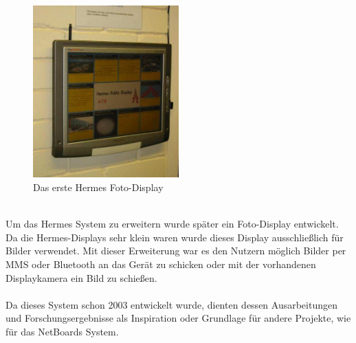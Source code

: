\begin{figure}[h!]
  \centering
  \includegraphics[width=0.5\textwidth]{./img/hermes_photoDisplay_short.png}
  \caption{Das erste Hermes Foto-Display\cite{cheverest:2012}}
  \label{img:hermesPhotoDisplay}
\end{figure}
\\
Um das Hermes System zu erweitern wurde später ein Foto-Display  entwickelt\cite{cheveres:2005:hermes-bluetooth}. Da die Hermes-Displays sehr klein waren wurde dieses Display ausschließlich für Bilder verwendet.
Mit dieser Erweiterung war es den Nutzern möglich Bilder per MMS oder Bluetooth an das Gerät zu schicken oder mit der vorhandenen Displaykamera ein Bild zu schießen.
\\
\\
Da dieses System schon 2003 entwickelt wurde, dienten dessen Ausarbeitungen und Forschungsergebnisse als Inspiration oder Grundlage für andere Projekte, wie \bspw für das NetBoards System. 

